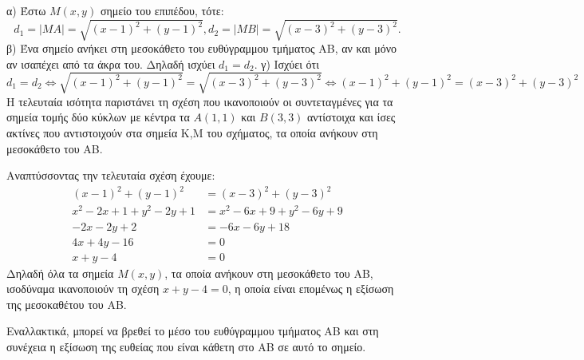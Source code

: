 α) Έστω $M(x,y)$ σημείο του επιπέδου, τότε:
\[ d_1 = |MA| = \sqrt{(x-1)^2+(y-1)^2}, d_2 = |MB| = \sqrt{(x-3)^2+(y-3)^2}. \]
β) Ένα σημείο ανήκει στη μεσοκάθετο του ευθύγραμμου τμήματος AB, αν και μόνο αν ισαπέχει από τα άκρα του. Δηλαδή ισχύει $d_1=d_2$.
γ) Ισχύει ότι
\[ d_1=d_2 \Leftrightarrow \sqrt{(x-1)^2+(y-1)^2}=\sqrt{(x-3)^2+(y-3)^2} \Leftrightarrow (x-1)^2+(y-1)^2=(x-3)^2+(y-3)^2 \]
Η τελευταία ισότητα παριστάνει τη σχέση που ικανοποιούν οι συντεταγμένες για τα σημεία τομής δύο κύκλων με κέντρα τα $A(1,1)$ και $B(3,3)$ αντίστοιχα και ίσες ακτίνες που αντιστοιχούν στα σημεία K,M του σχήματος, τα οποία ανήκουν στη μεσοκάθετο του ΑΒ.


Αναπτύσσοντας την τελευταία σχέση έχουμε:
\begin{align*} (x-1)^2+(y-1)^2&=(x-3)^2+(y-3)^2 \\ x^2-2x+1+y^2-2y+1&=x^2-6x+9+y^2-6y+9 \\ -2x-2y+2&=-6x-6y+18 \\ 4x+4y-16&=0 \\ x+y-4&=0 \end{align*}
Δηλαδή όλα τα σημεία $M(x,y)$, τα οποία ανήκουν στη μεσοκάθετο του AB, ισοδύναμα ικανοποιούν τη σχέση $x+y-4=0$, η οποία είναι επομένως η εξίσωση της μεσοκαθέτου του AB.

Εναλλακτικά, μπορεί να βρεθεί το μέσο του ευθύγραμμου τμήματος AB και στη συνέχεια η εξίσωση της ευθείας που είναι κάθετη στο AB σε αυτό το σημείο.

